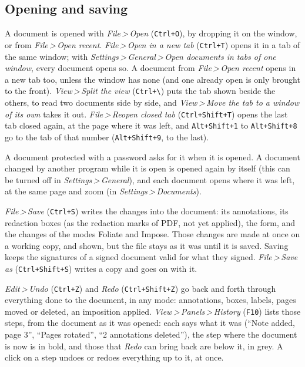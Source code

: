 \documentclass[12pt,
              article,
              oneside
              ]{memoir}
\newcommand*{\menu}[1]{\textit{#1}}
\newcommand*{\then}{\,>\,}
\newcommand*{\key}[1]{\texttt{#1}}
\begin{document}
\subsection{Opening and saving}

%
A document is opened with \menu{File\then Open} (\key{Ctrl+O}), by dropping
it on the window, or from \menu{File\then Open recent}. \menu{File\then Open
in a new tab} (\key{Ctrl+T}) opens it in a tab of the same window; with
\menu{Settings\then General\then Open documents in tabs of one window},
every document opens so. A document from \menu{File\then Open recent}
opens in a new tab too, unless the window has none (and one already open
is only brought to the front). \menu{View\then Split the view}
(\key{Ctrl+\textbackslash}) puts the tab shown beside the others, to read
two documents side by side, and \menu{View\then Move the tab to a window of
its own} takes it out. \menu{File\then Reopen closed tab}
(\key{Ctrl+Shift+T}) opens the last tab closed again, at the page where it
was left, and \key{Alt+Shift+1} to \key{Alt+Shift+8} go to the tab of that
number (\key{Alt+Shift+9}, to the last).

%
A document protected with a password asks for it when it is opened. A
document changed by another program while it is open is opened again by
itself (this can be turned off in \menu{Settings\then General}), and each
document opens where it was left, at the same page and zoom (in
\menu{Settings\then Documents}).

%
\menu{File\then Save} (\key{Ctrl+S}) writes the changes into the document:
its annotations, its redaction boxes (as the redaction marks of PDF, not
yet applied), the form, and the changes of the modes Foliate and Impose.
Those changes are made at once on a working copy, and shown, but the file
stays as it was until it is saved. Saving keeps the signatures of a signed
document valid for what they signed. \menu{File\then Save as}
(\key{Ctrl+Shift+S}) writes a copy and goes on with it.

%
\menu{Edit\then Undo} (\key{Ctrl+Z}) and \menu{Redo} (\key{Ctrl+Shift+Z})
go back and forth through everything done to the document, in any mode:
annotations, boxes, labels, pages moved or deleted, an imposition applied.
%
\menu{View\then Panels\then History} (\key{F10}) lists those steps, from
the document as it was opened: each says what it was (\enquote{Note added,
page 3}, \enquote{Pages rotated}, \enquote{2 annotations deleted}), the
step where the document is now is in bold, and those that \menu{Redo} can
bring back are below it, in grey. A click on a step undoes or redoes
everything up to it, at once.
\end{document}
